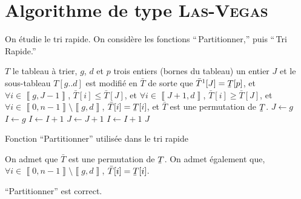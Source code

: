 \section{Algorithme de type {\scshape Las-Vegas}}

On étudie le tri rapide. On considère les fonctions ``\,Partitionner,'' puis ``\,Tri Rapide.''

\begin{algorithm}[H]
	\centering
	\begin{algorithmic}[1]
		\Entree $T$\/ le tableau à trier, $g$, $d$\/ et $p$\/ trois entiers (bornes du tableau)
		\Sortie un entier $J$\/ et le sous-tableau $T[g..d]$\/ est modifié en $\bar{T}$\/ de sorte que $\bar{T}\footnotemark\relax[J] = \ubar{T}[p]$, et $\forall i \in \left\llbracket g, J-1 \right\rrbracket$, $\bar{T}[i] \le \bar{T}[J]$, et $\forall i \in \left\llbracket J+1, d \right\rrbracket$, $\bar{T}[i] \ge \bar{T}[J]$, et $\forall i \in \left\llbracket 0,n-1 \right\rrbracket \setminus \left\llbracket g,d \right\rrbracket$, $\bar{T}[i] = \ubar{T}[i]$, et $\bar{T}$\/ est une permutation de $\ubar{T}$.
		\State {} 
		\State $J \gets g$\/
		\State  $I \gets g$\/ 
			 
				\State $I \gets I + 1$\/ 
			\Else {}
				\State {}
				\State $J \gets J + 1$\/
				\State $I \gets I + 1$\/
			\EndIf
		\EndWhile
		\State {}
		\State\Return $J$\/
	\end{algorithmic}
	\caption{Fonction ``Partitionner'' utilisée dans le tri rapide}
\end{algorithm}

\begin{rmk}
	On admet que $\bar{T}$\/ est une permutation de $\ubar{T}$. On admet également que, $\forall i \in \left\llbracket 0,n-1 \right\rrbracket \setminus \left\llbracket g,d \right\rrbracket$, $\bar{T}[i] = \ubar{T}[i]$.
\end{rmk}

\begin{lem}
	``Partitionner'' est correct.
\end{lem}

